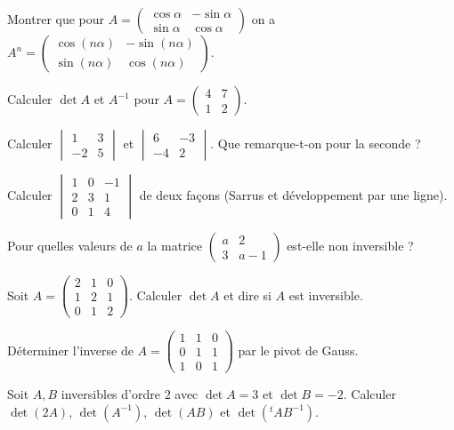 \exo{} Montrer que pour $A=\begin{pmatrix}\cos\alpha&-\sin\alpha\\\sin\alpha&\cos\alpha\end{pmatrix}$
on a $A^n=\begin{pmatrix}\cos(n\alpha)&-\sin(n\alpha)\\\sin(n\alpha)&\cos(n\alpha)\end{pmatrix}$.

\exo{} Calculer $\det A$ et $A^{-1}$ pour $A=\begin{pmatrix}4&7\\1&2\end{pmatrix}$.

\exo{} Calculer $\begin{vmatrix}1&3\\-2&5\end{vmatrix}$ et $\begin{vmatrix}6&-3\\-4&2\end{vmatrix}$.
Que remarque-t-on pour la seconde ?

\exo{} Calculer $\begin{vmatrix}1&0&-1\\2&3&1\\0&1&4\end{vmatrix}$ de deux façons (Sarrus et
développement par une ligne).

\exo{} Pour quelles valeurs de $a$ la matrice $\begin{pmatrix}a&2\\3&a-1\end{pmatrix}$
est-elle non inversible ?

\exo{} Soit $A=\begin{pmatrix}2&1&0\\1&2&1\\0&1&2\end{pmatrix}$. Calculer $\det A$ et dire si
$A$ est inversible.

\exo{} Déterminer l'inverse de $A=\begin{pmatrix}1&1&0\\0&1&1\\1&0&1\end{pmatrix}$ par le
pivot de Gauss.

\exo{} Soit $A,B$ inversibles d'ordre $2$ avec $\det A=3$ et $\det B=-2$. Calculer
$\det(2A)$, $\det(A^{-1})$, $\det(AB)$ et $\det({}^{t}\!A B^{-1})$.


